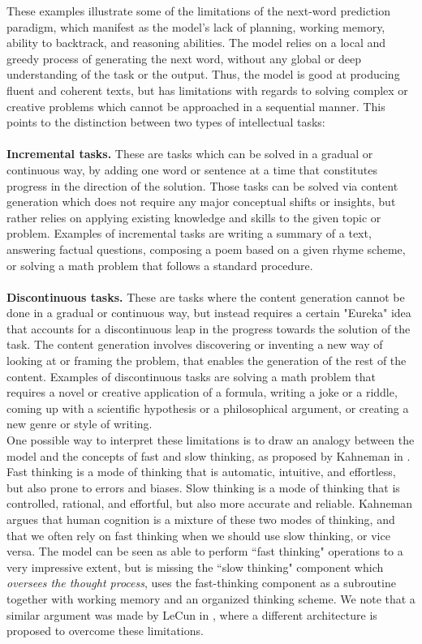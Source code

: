 These examples illustrate some of the limitations of the next-word prediction paradigm, which manifest as the model's lack of planning, working memory, ability to backtrack, and reasoning abilities. The model relies on a local and greedy process of generating the next word, without any global or deep understanding of the task or the output. Thus, the model is good at producing fluent and coherent texts, but has limitations with regards to solving complex or creative problems which cannot be approached in a sequential manner. This points to the distinction between two types of intellectual tasks:\\ \\
\textbf{Incremental tasks.} These are tasks which can be solved in a gradual or continuous way, by adding one word or sentence at a time that constitutes progress in the direction of the solution. Those tasks can be solved via content generation which does not require any major conceptual shifts or insights, but rather relies on applying existing knowledge and skills to the given topic or problem. Examples of incremental tasks are writing a summary of a text, answering factual questions, composing a poem based on a given rhyme scheme, or solving a math problem that follows a standard procedure.  \\ \\
\textbf{Discontinuous tasks.} These are tasks where the content generation cannot be done in a gradual or continuous way, but instead requires a certain "Eureka" idea that accounts for a discontinuous leap in the progress towards the solution of the task. The content generation involves discovering or inventing a new way of looking at or framing the problem, that enables the generation of the rest of the content. Examples of discontinuous tasks are solving a math problem that requires a novel or creative application of a formula, writing a joke or a riddle, coming up with a scientific hypothesis or a philosophical argument, or creating a new genre or style of writing. \\

One possible way to interpret these limitations is to draw an analogy between the model and the concepts of fast and slow thinking, as proposed by Kahneman in \cite{kahneman2011thinking}. Fast thinking is a mode of thinking that is automatic, intuitive, and effortless, but also prone to errors and biases. Slow thinking is a mode of thinking that is controlled, rational, and effortful, but also more accurate and reliable. Kahneman argues that human cognition is a mixture of these two modes of thinking, and that we often rely on fast thinking when we should use slow thinking, or vice versa. The model can be seen as able to perform ``fast thinking" operations to a very impressive extent, but is missing the ``slow thinking" component which \emph{oversees the thought process}, uses the fast-thinking component as a subroutine together with working memory and an organized thinking scheme. We note that a similar argument was made by LeCun in \cite{lecun2022path}, where a different architecture is proposed to overcome these limitations.


